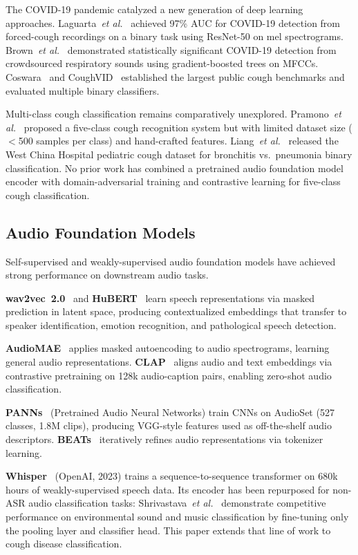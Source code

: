 \documentclass[10pt,journal,compsoc]{IEEEtran}
\begin{document}
The COVID-19 pandemic catalyzed a new generation of deep learning approaches.
Laguarta~\textit{et al.}~\cite{covid_cough_review} achieved 97\% AUC for
COVID-19 detection from forced-cough recordings on a binary task using
ResNet-50 on mel spectrograms. Brown~\textit{et al.}~\cite{brown_covid}
demonstrated statistically significant COVID-19 detection from
crowdsourced respiratory sounds using gradient-boosted trees on MFCCs.
Coswara~\cite{coswara} and CoughVID~\cite{coughvid} established the largest
public cough benchmarks and evaluated multiple binary classifiers.

Multi-class cough classification remains comparatively unexplored.
Pramono~\textit{et al.}~\cite{pramono} proposed a five-class cough recognition
system but with limited dataset size ($<$500 samples per class) and
hand-crafted features. Liang~\textit{et al.}~\cite{west_china} released the
West China Hospital pediatric cough dataset for bronchitis vs.\ pneumonia
binary classification. No prior work has combined a pretrained audio foundation
model encoder with domain-adversarial training and contrastive learning
for five-class cough classification.

\subsection{Audio Foundation Models}

Self-supervised and weakly-supervised audio foundation models have achieved
strong performance on downstream audio tasks.

\textbf{wav2vec~2.0}~\cite{wav2vec2} and \textbf{HuBERT}~\cite{hubert}
learn speech representations via masked prediction in latent space,
producing contextualized embeddings that transfer to speaker identification,
emotion recognition, and pathological speech detection.

\textbf{AudioMAE}~\cite{audiomae} applies masked autoencoding to audio
spectrograms, learning general audio representations. \textbf{CLAP}~\cite{clap}
aligns audio and text embeddings via contrastive pretraining on 128k
audio-caption pairs, enabling zero-shot audio classification.

\textbf{PANNs}~\cite{panns} (Pretrained Audio Neural Networks) train
CNNs on AudioSet (527 classes, 1.8M clips), producing VGG-style features
used as off-the-shelf audio descriptors. \textbf{BEATs}~\cite{beats}
iteratively refines audio representations via tokenizer learning.

\textbf{Whisper}~\cite{whisper}
(OpenAI, 2023) trains a sequence-to-sequence transformer on 680k hours
of weakly-supervised speech data. Its encoder has been repurposed for
non-ASR audio classification tasks: Shrivastava~\textit{et al.}~\cite{whisper_audio_cls}
demonstrate competitive performance on environmental sound and music
classification by fine-tuning only the pooling layer and classifier head.
This paper extends that line of work to cough disease classification.
\end{document}
